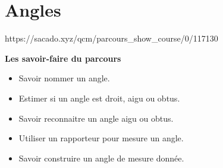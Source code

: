 %
%
%
%
%
%
%
%
%


\chapter{Angles}
{https://sacado.xyz/qcm/parcours_show_course/0/117130}
{
\begin{CpsCol}
 \textbf{Les savoir-faire du parcours}
\begin{itemize}
\item Savoir nommer un angle.
\item Estimer si un angle est droit, aigu ou obtus.   
\item Savoir reconnaitre un angle aigu ou obtus.   
\item Utiliser un rapporteur pour mesure un angle.
\item Savoir construire un angle de mesure donnée.
\end{itemize}
\end{CpsCol}
}




